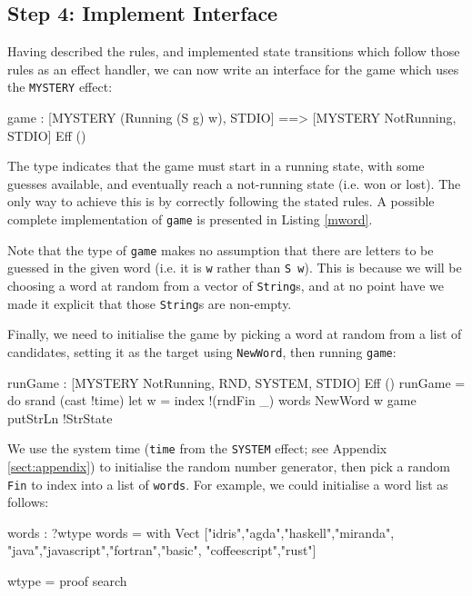 \subsection{Step 4: Implement Interface}

Having described the rules, and implemented state transitions which follow
those rules as an effect handler, we can now write an interface for the
game which uses the \texttt{MYSTERY} effect:

\begin{code}
game : { [MYSTERY (Running (S g) w), STDIO] ==>
         [MYSTERY NotRunning, STDIO] } Eff ()
\end{code}

\noindent
The type indicates that the game must start in a running state, with some
guesses available, and eventually reach a not-running state (i.e. won or lost). 
The only way to achieve this is by correctly following the stated rules.
A possible complete implementation of \texttt{game} is presented in Listing
\ref{mword}. 

Note that the type of \texttt{game} makes no assumption that there
are letters to be guessed in the given word (i.e. it is \texttt{w} rather than
\texttt{S w}). This is because we will be choosing a word at random from a
vector of \texttt{String}s, and at no point have we made it explicit that
those \texttt{String}s are non-empty.

Finally, we need to initialise the game by picking a word at random from a
list of candidates, setting it as the target using \texttt{NewWord}, then
running \texttt{game}:

\begin{code}
runGame : { [MYSTERY NotRunning, RND, SYSTEM, STDIO] } Eff ()
runGame = do srand (cast !time)
             let w = index !(rndFin _) words
             NewWord w
             game
             putStrLn !StrState
\end{code}

\noindent
We use the system time (\texttt{time} from the \texttt{SYSTEM} effect; see
Appendix \ref{sect:appendix}) to initialise the random number generator,
then pick a random \texttt{Fin} to index into a list of \texttt{words}.
For example, we could initialise a word list as follows:

\begin{code}
words : ?wtype
words = with Vect ["idris","agda","haskell","miranda",
         "java","javascript","fortran","basic",
         "coffeescript","rust"]
  
wtype = proof search
\end{code}

